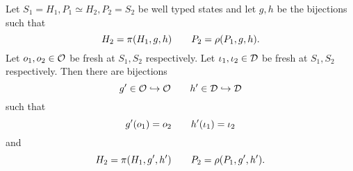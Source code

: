 \begin{proposition}
  Let $S_1 = H_1, P_1 \simeq H_2, P_2 = S_2$ be well typed states and let $g, h$
  be the bijections such that
  \begin{equation} \label{eq:propnewgh1}
    H_2 = \pi(H_1, g, h) \quad\quad P_2 = \rho(P_1, g, h).
  \end{equation}
  Let $o_1, o_2 \in \mathcal{O}$ be fresh at $S_1, S_2$ respectively.
  Let $\iota_1, \iota_2 \in \mathcal{D}$ be fresh at $S_1, S_2$ respectively.
  Then there are bijections
  \begin{equation*}
    g' \in \mathcal{O} \hookrightarrow \mathcal{O} \quad\quad h' \in \mathcal{D} \hookrightarrow \mathcal{D}
  \end{equation*}
  such that 
  \begin{equation} \label{eq:propnewgh2}
    g'(o_1) = o_2 \quad\quad h'(\iota_1) = \iota_2
  \end{equation} 
  and
  \begin{equation} \label{eq:propnewgh3}
    H_2 = \pi(H_1, g', h') \quad\quad P_2 = \rho(P_1, g', h').
  \end{equation}
\end{proposition}

